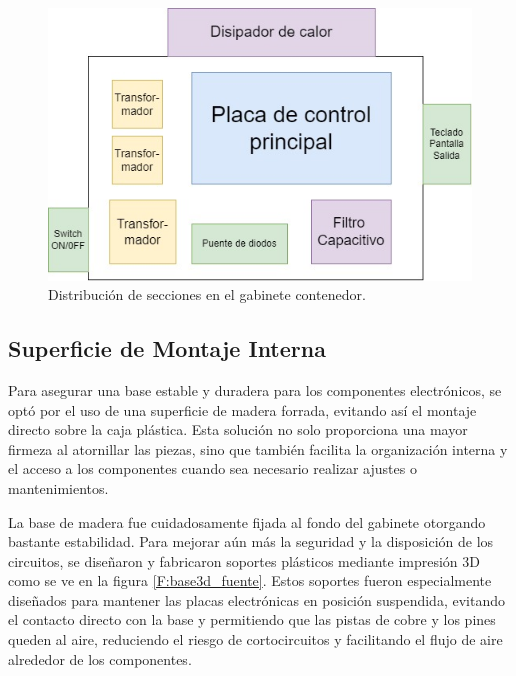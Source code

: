 \begin{figure}[H]
    \centering
    \includegraphics[scale=0.5]{./imagenes/distribucion_secciones.jpg}
    \caption{Distribución de secciones en el gabinete contenedor.}
    \label{F:distibucion_gabinete_contenedor}
\end{figure}

\subsection{Superficie de Montaje Interna}
Para asegurar una base estable y duradera para los componentes electrónicos, se optó por el uso de una superficie de madera forrada, evitando así el montaje directo sobre la caja plástica. Esta solución no solo proporciona una mayor firmeza al atornillar las piezas, sino que también facilita la organización interna y el acceso a los componentes cuando sea necesario realizar ajustes o mantenimientos.\par
La base de madera fue cuidadosamente fijada al fondo del gabinete otorgando bastante estabilidad. Para mejorar aún más la seguridad y la disposición de los circuitos, se diseñaron y fabricaron soportes plásticos mediante impresión 3D como se ve en la figura \ref{F:base3d_fuente}. Estos soportes fueron especialmente diseñados para mantener las placas electrónicas en posición suspendida, evitando el contacto directo con la base y permitiendo que las pistas de cobre y los pines queden al aire, reduciendo el riesgo de cortocircuitos y facilitando el flujo de aire alrededor de los componentes.\par

